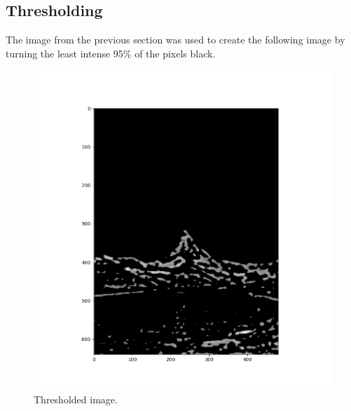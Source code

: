 \documentclass[11pt]{article}
\begin{document}
\subsection{Thresholding} %
The image from the previous section was used to create the following image by turning the least intense 95\% of the pixels black.
\begin{figure}[h]
	\centering
	\includegraphics[width=0.6 \textwidth]{figures/thresholded.png}
	\caption{Thresholded image.}
\end{figure}
\end{document}
